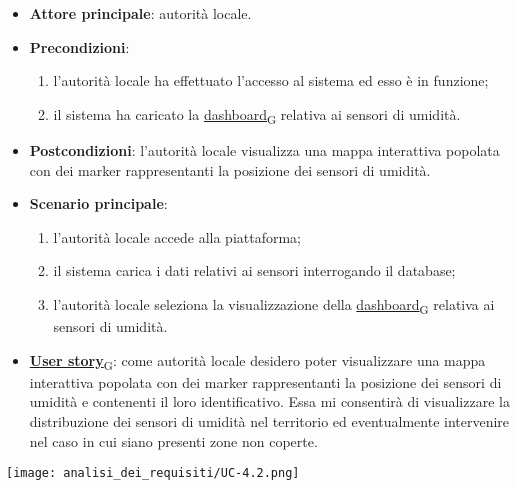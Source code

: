 \newpage

\begin{itemize}
	\item \textbf{Attore principale}: autorità locale.
	\item \textbf{Precondizioni}:
	      \begin{enumerate}
		      \item l'autorità locale ha effettuato l'accesso al sistema ed esso è in funzione;
		      \item il sistema ha caricato la \href{https://7last.github.io/docs/rtb/documentazione-interna/glossario\#dashboard}{dashboard\textsubscript{G}} relativa ai sensori di umidità.
	      \end{enumerate}
	\item \textbf{Postcondizioni}: l'autorità locale visualizza una mappa interattiva popolata con dei marker rappresentanti la posizione dei sensori di umidità.
	\item \textbf{Scenario principale}:
	      \begin{enumerate}
		      \item l'autorità locale accede alla piattaforma;
		      \item il sistema carica i dati relativi ai sensori interrogando il database;
		      \item l'autorità locale seleziona la visualizzazione della \href{https://7last.github.io/docs/rtb/documentazione-interna/glossario\#dashboard}{dashboard\textsubscript{G}} relativa ai sensori di umidità.
	      \end{enumerate}
	\item \href{https://7last.github.io/docs/rtb/documentazione-interna/glossario\#user-story}{\textbf{User story}\textsubscript{G}}:
	      come autorità locale desidero poter visualizzare una mappa interattiva popolata con dei marker rappresentanti la posizione dei sensori di umidità
	      e contenenti il loro identificativo. Essa mi consentirà di visualizzare la distribuzione dei sensori di umidità nel territorio ed eventualmente intervenire nel caso in cui siano presenti zone non coperte.
\end{itemize}
\begin{center}
	\texttt{[image: analisi\_dei\_requisiti/UC-4.2.png]}
\end{center}

\newpage

